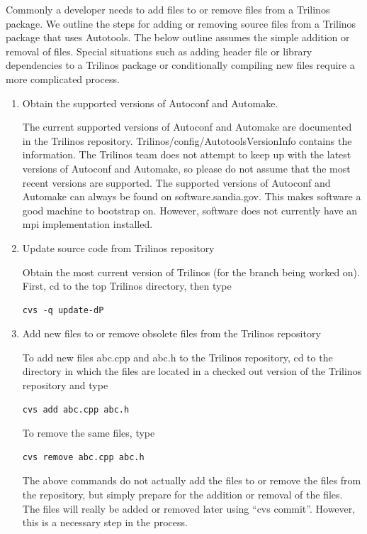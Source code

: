 \documentclass[12pt,relax]{TrilinosDevGuide}
\begin{document}
Commonly a developer needs to add files to or remove files from a Trilinos 
package.  We outline the steps for adding or removing source files from a 
Trilinos package that uses Autotools.  The below outline assumes the simple 
addition or removal of files.  Special situations such as adding header file 
or library dependencies to a Trilinos package or conditionally compiling new 
files require a more complicated process.
\begin{enumerate}
\item Obtain the supported versions of Autoconf and Automake.

The current supported versions of Autoconf and Automake are documented in 
the Trilinos repository.  Trilinos/config/AutotoolsVersionInfo contains the 
information.  The Trilinos team does not attempt to keep up with the latest 
versions of Autoconf and Automake, so please do not assume that the most 
recent versions are supported.  The supported versions of Autoconf and 
Automake can always be found on software.sandia.gov.  This makes software a 
good machine to bootstrap on.  However, software does not currently have an
mpi implementation installed.

\item Update source code from Trilinos repository

Obtain the most current version of Trilinos (for the branch being worked on).  
First, cd to the top Trilinos directory, then type
\begin{verbatim}
cvs -q update-dP
\end{verbatim}

\item Add new files to or remove obsolete files from the Trilinos repository

To add new files abc.cpp and abc.h to the Trilinos repository, cd to the 
directory in which the files are located in a checked out version of the 
Trilinos repository and type
\begin{verbatim}
cvs add abc.cpp abc.h
\end{verbatim}
To remove the same files, type
\begin{verbatim}
cvs remove abc.cpp abc.h
\end{verbatim}
The above commands do not actually add the files to or remove the files 
from the repository, but simply prepare for the addition or removal of the 
files.  The files will really be added or removed later using ``cvs commit''.  
However, this is a necessary step in the process.


\end{enumerate}
\end{document}

